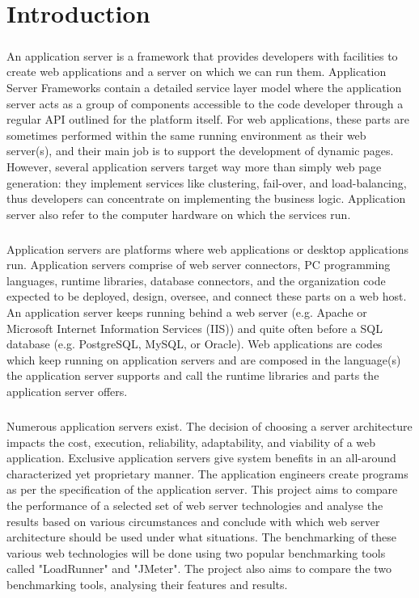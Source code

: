 \documentclass[thesis.tex]{subfiles}
\begin{document}
\chapter{Introduction}

\paragraph{}
An application server is a framework that provides developers with facilities to create web applications and a server on which we can run them. Application Server Frameworks contain a detailed service layer model where the application server acts as a group of components accessible to the code developer through a regular API outlined for the platform itself. For web applications, these parts are sometimes performed within the same running environment as their web server(s), and their main job is to support the development of dynamic pages. However, several application servers target way more than simply web page generation: they implement services like clustering, fail-over, and load-balancing, thus developers can concentrate on implementing the business logic.
Application server also refer to the computer hardware on which the services run.
\paragraph{}
Application servers are platforms where web applications or desktop applications run. Application servers comprise of web server connectors, PC programming languages, runtime libraries, database connectors, and the organization code expected to be deployed, design, oversee, and connect these parts on a web host. An application server keeps running behind a web server (e.g. Apache or Microsoft Internet Information Services (IIS)) and quite often before a SQL database (e.g. PostgreSQL, MySQL, or Oracle). Web applications are codes which keep running on application servers and are composed in the language(s) the application server supports and call the runtime libraries and parts the application server offers.
\paragraph{}
Numerous application servers exist. The decision of choosing a server architecture impacts the cost, execution, reliability, adaptability, and viability of a web application. Exclusive application servers give system benefits in an all-around characterized yet proprietary manner. The application engineers create programs as per the specification of the application server. This project aims to compare the performance of a selected set of web server technologies and analyse the results based on various circumstances and conclude with which web server architecture should be used under what situations. The benchmarking of these various web technologies will be done using two popular benchmarking tools called "LoadRunner" and "JMeter". The project also aims to compare the two benchmarking tools, analysing their features and results.
\end{document}
